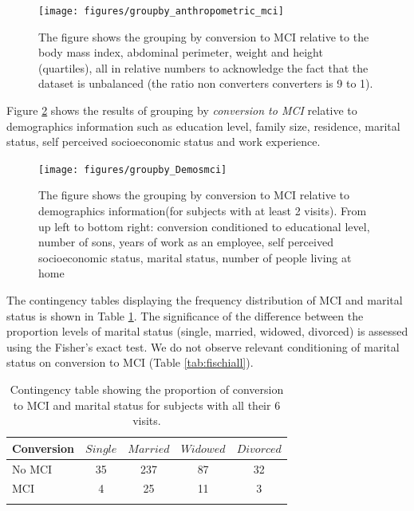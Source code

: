 \documentclass[11pt]{article}
\theoremstyle{definition}
\theoremstyle{remark}
\begin{document}
\begin{figure}[!htb]
        \centering
        \texttt{[image: figures/groupby\_anthropometric\_mci]}
        \caption{The figure shows the grouping by conversion to MCI relative to the body mass index, abdominal perimeter, weight and height (quartiles), all in relative numbers to acknowledge the fact that the dataset is unbalanced (the ratio non converters converters is 9 to 1).} 
        \label{fig:groupby_anthropometric_mci}
\end{figure}

Figure \ref{fig:groupby_Demosmci} shows the results of grouping by \emph{conversion to MCI} relative to demographics information such as education level, family size, residence, marital status, self perceived socioeconomic status and work experience. 

\begin{figure}[!htb]
        \centering
        \texttt{[image: figures/groupby\_Demosmci]}
        \caption{The figure shows the grouping by conversion to MCI relative to demographics information(for subjects with at least 2 visits). From up left to bottom right: conversion conditioned to educational level, number of sons, years of work as an employee, self perceived socioeconomic status, marital status, number of people living at home } 
        \label{fig:groupby_Demosmci}
\end{figure}

The contingency tables displaying the frequency distribution of MCI and marital status is shown in Table \ref{tab:maritmci}. The significance of the difference between the proportion levels of marital status (single, married, widowed, divorced) is assessed using the Fisher's exact test.
We do not observe relevant conditioning of marital status on conversion to MCI (Table \ref{tab:fischiall}).

\begin{table}[!htb]
  \centering
  \caption{Contingency table showing the proportion of conversion to MCI and marital status for subjects with all their 6 visits.}
  \begin{tabular}[t]{lcccc}
  \hline
  Conversion&{$Single$}&{$Married$}&{$Widowed$}&{$Divorced$} \\
  \hline
  No MCI&35&237&87&32\\  
  MCI&4&25&11&3\\
  \hline
  \label{tab:maritmci}
  \end{tabular}
\end{table}%
\end{document}

